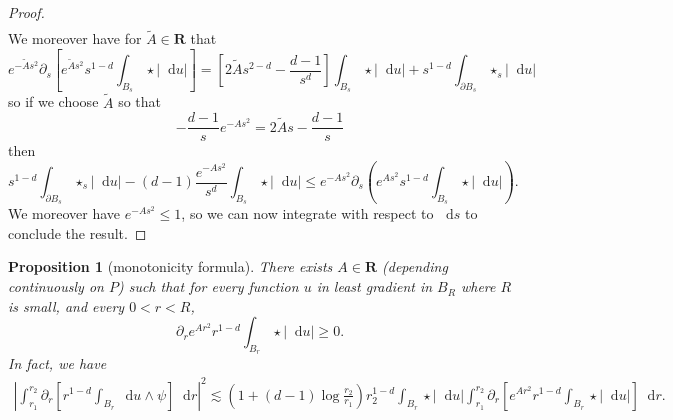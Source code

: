 \documentclass[reqno,12pt,letterpaper]{amsart}
\newcommand{\RR}{\mathbf{R}}
\newcommand*\dif{\mathop{}\!\mathrm{d}}
\newtheorem{proposition}[theorem]{Proposition}
\theoremstyle{definition}
\numberwithin{equation}{section}
\begin{document}
\begin{proof}
\begin{align*}
\end{align*}
We moreover have for $\tilde A \in \RR$ that
$$e^{-\tilde As^2} \partial_s \left[e^{\tilde As^2} s^{1 - d} \int_{B_s} \star |\dif u|\right] = \left[2\tilde As^{2 - d} - \frac{d - 1}{s^d}\right]\int_{B_s} \star |\dif u| + s^{1 - d} \int_{\partial B_s} \star_s |\dif u|$$
so if we choose $\tilde A$ so that
$$-\frac{d - 1}{s} e^{-As^2} = 2\tilde As - \frac{d - 1}{s}$$
then
$$s^{1 - d} \int_{\partial B_s} \star_s |\dif u| - (d - 1)\frac{e^{-As^2}}{s^d} \int_{B_s} \star|\dif u| \leq e^{-As^2} \partial_s\left(e^{As^2} s^{1 - d} \int_{B_s} \star|\dif u|\right).$$
We moreover have $e^{-As^2} \leq 1$, so we can now integrate with respect to $\dif s$ to conclude the result.
\end{proof}

\begin{proposition}[monotonicity formula]\label{Monotonicity Formula}\label{sharp monotonicity}
There exists $A \in \RR$ (depending continuously on $P$) such that for every function $u$ in least gradient in $B_R$ where $R$ is small, and every $0 < r < R$,
\begin{equation}\label{weak monotone}
\partial_r e^{Ar^2} r^{1 - d} \int_{B_r} \star|\dif u| \geq 0.
\end{equation}
In fact, we have
\begin{align*}
\left|\int_{r_1}^{r_2} \partial_r \left[r^{1 - d}\int_{B_r} \dif u \wedge \psi\right] \dif r\right|^2 \lesssim \left(1 + (d - 1)\log\frac{r_2}{r_1}\right)r_2^{1 - d}\int_{B_r} \star |\dif u| \int_{r_1}^{r_2} \partial_r \left[e^{Ar^2} r^{1 - d}\int_{B_r} \star |\dif u|\right] \dif r.
\end{align*}
\end{proposition}
\end{document}
